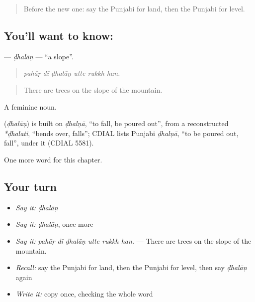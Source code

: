 \label{lesson:PA-C293-dhalan}



\begin{quote}
Before the new one: say the Punjabi for land, then the Punjabi for level.
\end{quote}

\subsection*{You'll want to know: }
\textbf{} — \emph{ḍhalāṇ} — \textquotedblleft{}a slope\textquotedblright{}.

\begin{quote}
     
\end{quote}

\begin{quote}
\emph{pahāṛ dī ḍhalāṇ utte rukkh han.}
\end{quote}

\begin{quote}
There are trees on the slope of the mountain.
\end{quote}

A feminine noun.

\begin{cousinweb}
\textbf{} (\emph{ḍhalāṇ}) is built on \emph{ḍhalṇā}, \textquotedblleft{}to fall, be poured out\textquotedblright{}, from a reconstructed \emph{*ḍhalati}, \textquotedblleft{}bends over, falls\textquotedblright{}; CDIAL lists Punjabi \emph{ḍhalṇā}, \textquotedblleft{}to be poured out, fall\textquotedblright{}, under it (CDIAL 5581).
\end{cousinweb}

\begin{grammarlens}[title={What you've built}]
One more word for this chapter.
\end{grammarlens}

\subsection*{Your turn}
\begin{itemize}
\raggedright
  \item \emph{Say it:} \emph{ḍhalāṇ}
  \item \emph{Say it:} \emph{ḍhalāṇ}, once more
  \item \emph{Say it:} \emph{pahāṛ dī ḍhalāṇ utte rukkh han.} — There are trees on the slope of the mountain.
  \item \emph{Recall:} say the Punjabi for land, then the Punjabi for level, then say \emph{ḍhalāṇ} again
  \item \emph{Write it:} copy \textbf{} once, checking the whole word
\end{itemize}

